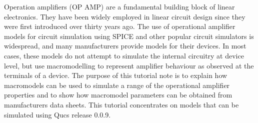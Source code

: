 %
%
%
%

\renewcommand{\thesubfigure}{\thefigure(\alph{subfigure})}
\makeatletter
  \renewcommand{\@thesubfigure}{\thesubfigure:\space}
  \renewcommand{\p@subfigure}{}
\makeatother

\renewcommand{\thesubtable}{\thetable(\alph{subtable})}
\makeatletter
  \renewcommand{\@thesubtable}{\thesubtable:\space}
  \renewcommand{\p@subtable}{}
\makeatother


Operation amplifiers (OP AMP) are a fundamental building block of linear electronics.  They have been widely employed in linear circuit design since they were first introduced over thirty years ago. The use of operational amplifier models for circuit simulation using SPICE and other popular circuit simulators is widespread, and many manufacturers provide models for their devices. In most cases, these models do not attempt to simulate the internal circuitry at device level, but use macromodelling to represent amplifier behaviour as observed at the terminals of a device.  The purpose of this tutorial note is to explain how macromodels can be used to simulate a range of the operational amplifier properties and to show how macromodel parameters can be obtained from manufacturers data sheets.  This tutorial concentrates on models that can be simulated using Qucs release 0.0.9.





